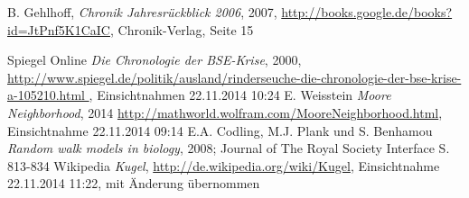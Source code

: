 \documentclass[10pt,twocolumn]{scrartcl}
\begin{document}


%
%

\begin{thebibliography}{99}
	B. Gehlhoff,  \textit{Chronik Jahresrückblick 2006}, 2007,
	\url{http://books.google.de/books?id=JtPnf5K1CaIC},
	Chronik-Verlag, Seite 15
	
	
Spiegel Online {\it Die Chronologie der BSE-Krise}, 2000, \url{
	http://www.spiegel.de/politik/ausland/rinderseuche-die-chronologie-der-bse-krise-a-105210.html
	}, Einsichtnahmen 22.11.2014 10:24
E. Weisstein {\it Moore Neighborhood}, 2014 \url{http://mathworld.wolfram.com/MooreNeighborhood.html}, Einsichtnahme 22.11.2014 09:14
E.A. Codling, M.J. Plank und S. Benhamou {\it Random walk models in biology}, 2008; Journal of The Royal Society Interface S. 813-834
Wikipedia {\it Kugel}, \url{http://de.wikipedia.org/wiki/Kugel}, Einsichtnahme 22.11.2014 11:22, mit Änderung übernommen


\end{thebibliography}
\end{document}
